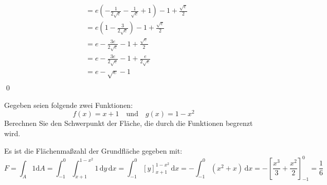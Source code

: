 \documentclass[answers]{exam}
\renewcommand{\d}{\,\mathrm{d}}
\begin{document}
\begin{questions}
\begin{parts}
\begin{solution}
$$\begin{aligned}
                                                         & = e\left(-\frac{1}{2\sqrt{e}} - \frac{1}{\sqrt{e}} + 1   \right) - 1 + \frac{\sqrt{e}}{2}                                                                                   \\
                                                         & = e\left(1 -\frac{3}{2\sqrt{e}} \right) - 1 + \frac{\sqrt{e}}{2}                                                                                                            \\
                                                         & = e -\frac{3e}{2\sqrt{e}} - 1 + \frac{\sqrt{e}}{2}                                                                                                                          \\
                                                         & = e -\frac{3e}{2\sqrt{e}} - 1 + \frac{e}{2\sqrt{e}}                                                                                                                         \\
                                                         & = e -\sqrt{e} - 1                                                                                                                                                           \\
                \end{aligned}
            $$\qed
        \end{solution}
    \end{parts}

    \newpage
    \question
    Gegeben seien folgende zwei Funktionen:
    $$
        f(x) = x + 1 \quad \text{und} \quad g(x) = 1-x^2
    $$
    Berechnen Sie den Schwerpunkt der Fläche, die durch die Funktionen begrenzt wird.
    \begin{solution}
        Es ist die Flächenmaßzahl der Grundfläche gegeben mit:
        $$
            F = \int_A 1 \mathrm{d} A = \int^0_{-1}  \int^{1-x^2}_{x+1} 1 \d y \d x = \int^0_{-1} [y]^{1-x^2}_{x+1} \d x = -\int^0_{-1} \left( x^2 + x \right) \d x = -\left[ \frac{x^3}{3} + \frac{x^2}{2} \right]^0_{-1} = \frac{1}{6}
        $$


\end{solution}
\end{questions}
\end{document}
